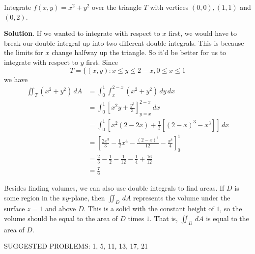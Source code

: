 \documentclass[10pt,]{book}
\theoremstyle{ptxplainnotitle}
\theoremstyle{ptxplaintitle}
\theoremstyle{ptxplainnotitle}
\theoremstyle{ptxplaintitle}
\theoremstyle{ptxplainnotitle}
\theoremstyle{ptxplaintitle}
\theoremstyle{ptxdefinitionnotitle}
\theoremstyle{ptxdefinitiontitle}
\theoremstyle{ptxdefinitionnotitle}
\theoremstyle{ptxdefinitiontitle}
\theoremstyle{ptxdefinitionnotitle}
\theoremstyle{ptxdefinitiontitle}
\theoremstyle{ptxdefinitionnotitle}
\theoremstyle{ptxdefinitiontitle}
\theoremstyle{ptxdefinitionnotitle}
\theoremstyle{ptxdefinitiontitle}
\numberwithin{equation}{section}
\begin{document}
\begin{example}\label{example-integrating-over-a-triangle}
\hypertarget{p-1137}{}%
Integrate \(f(x,y) = x^{2} + y^{2}\) over the triangle \(T\) with vertices \((0,0), (1,1)\) and \((0,2)\).%
\par\smallskip%
\noindent\textbf{Solution}.\hypertarget{solution-181}{}\quad%
\hypertarget{p-1138}{}%
If we wanted to integrate with respect to \(x\) first, we would have to break our double integral up into two different double integrals. This is because the limits for \(x\) change halfway up the triangle. So it'd be better for us to integrate with respect to \(y\) first. Since%
\begin{equation*}
T = \{(x,y) : x \leq y \leq 2-x, 0\leq x\leq 1
\end{equation*}
we have%
\begin{align*}
\iint_{T}(x^{2} + y^{2})\,dA & = \int_{0}^{1}\int_{x}^{2-x}(x^{2} + y^{2})\,dy\,dx \\
& = \int_{0}^{1}\left[x^{2}y + \frac{y^{3}}{3}\right]_{y=x}^{2-x}\,dx \\
& = \int_{0}^{1} \left[x^{2}(2-2x) + \frac{1}{3}[(2-x)^{3} - x^{3}]\right]\,dx \\
& = \left[\frac{2x^{3}}{3} - \frac{1}{2}x^{4} - \frac{(2-x)^{4}}{12} - \frac{x^{4}}{4}\right]_{0}^{1} \\
& = \frac{2}{3} - \frac{1}{2} - \frac{1}{12} - \frac{1}{4} + \frac{16}{12} \\
& = \frac{7}{6} 
\end{align*}
%
\end{example}
\hypertarget{p-1139}{}%
Besides finding volumes, we can also use double integrals to find areas. If \(D\) is some region in the \(xy\)-plane, then \(\iint_{D}\,dA\) represents the volume under the surface \(z=1\) and above \(D\). This is a solid with the constant height of \(1\), so the volume should be equal to the area of \(D\) times \(1\). That is, \(\iint_{D}\,dA\) is equal to the area of \(D\).%
\par
\hypertarget{p-1140}{}%
SUGGESTED PROBLEMS: 1, 5, 11, 13, 17, 21%
\typeout{************************************************}
\typeout{************************************************}
\end{document}
